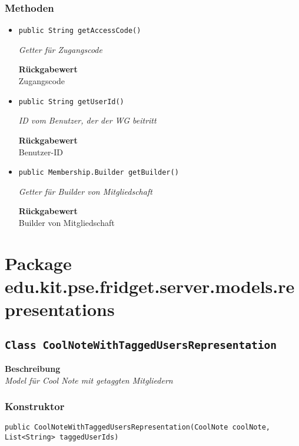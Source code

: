     \subsubsection*{Methoden}
    \begin{itemize}
    	\item{\texttt{public String getAccessCode()}}
    	
    	\textit{Getter für Zugangscode}
    	
    	
    	
    	\textbf{Rückgabewert} \\
    	Zugangscode        \item{\texttt{public String getUserId()}}
    	
    	\textit{ID vom Benutzer, der der WG beitritt}
    	
    	
    	
    	\textbf{Rückgabewert} \\
    	Benutzer-ID        \item{\texttt{public Membership.Builder getBuilder()}}
    	
    	\textit{Getter für Builder von Mitgliedschaft}
    	
    	
    	
    	\textbf{Rückgabewert} \\
    	Builder von Mitgliedschaft
    \end{itemize}
    \section{Package edu.kit.pse.fridget.server.models.representations}
    \subsection{\texttt{Class CoolNoteWithTaggedUsersRepresentation}}
    \textbf{Beschreibung} \\
    \textit{Model für Cool Note mit getaggten Mitgliedern}
    \subsubsection*{Konstruktor}
    \texttt{public CoolNoteWithTaggedUsersRepresentation(CoolNote coolNote, List<String> taggedUserIds)}
